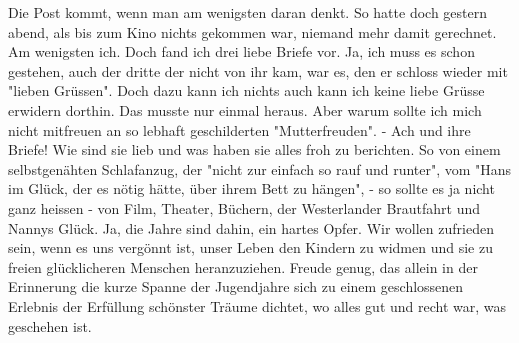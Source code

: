 \def\day{2. Mai 1943}
\mktitle

Die Post kommt, wenn man am wenigsten daran denkt.
So hatte doch gestern abend, als bis zum Kino nichts gekommen war, niemand mehr damit gerechnet.
Am wenigsten ich.
Doch fand ich drei liebe Briefe vor.
Ja, ich muss es schon gestehen, auch der dritte der nicht von ihr kam, war es, den er schloss wieder mit "lieben Gr\"{u}ssen".
Doch dazu kann ich nichts auch kann ich keine liebe Gr\"{u}sse erwidern dorthin.
Das musste nur einmal heraus.
Aber warum sollte ich mich nicht mitfreuen an so lebhaft geschilderten "Mutterfreuden".
- Ach und ihre Briefe!
Wie sind sie lieb und was haben sie alles froh zu berichten.
So von einem selbstgen\"{a}hten Schlafanzug, der "nicht zur einfach so rauf und runter", vom "Hans im Gl\"{u}ck, der es n\"{o}tig h\"{a}tte, \"{u}ber ihrem Bett zu h\"{a}ngen", - so sollte es ja nicht ganz heissen -  von Film, Theater, B\"{u}chern, der Westerlander Brautfahrt und Nannys Gl\"{u}ck.
Ja, die Jahre sind dahin, ein hartes Opfer.
Wir wollen zufrieden sein, wenn es uns verg\"{o}nnt ist, unser Leben den Kindern zu widmen und sie zu freien gl\"{u}cklicheren Menschen heranzuziehen.
Freude genug, das allein in der Erinnerung die kurze Spanne der Jugendjahre sich zu einem geschlossenen Erlebnis der Erf\"{u}llung sch\"{o}nster Tr\"{a}ume dichtet, wo alles gut und recht war, was geschehen ist.

\clearpage
